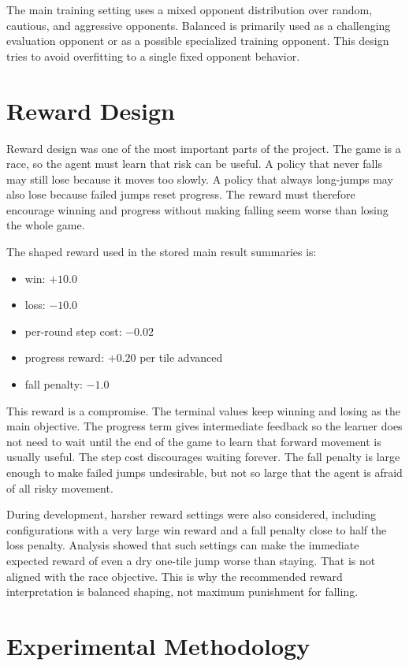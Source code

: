 \documentclass[conference]{IEEEtran}
\begin{document}
The main training setting uses a mixed opponent distribution over random,
cautious, and aggressive opponents. Balanced is primarily used as a challenging
evaluation opponent or as a possible specialized training opponent. This design
tries to avoid overfitting to a single fixed opponent behavior.

\section{Reward Design}

Reward design was one of the most important parts of the project. The game is a
race, so the agent must learn that risk can be useful. A policy that never falls
may still lose because it moves too slowly. A policy that always long-jumps may
also lose because failed jumps reset progress. The reward must therefore encourage
winning and progress without making falling seem worse than losing the whole game.

The shaped reward used in the stored main result summaries is:

\begin{itemize}
\item win: $+10.0$
\item loss: $-10.0$
\item per-round step cost: $-0.02$
\item progress reward: $+0.20$ per tile advanced
\item fall penalty: $-1.0$
\end{itemize}

This reward is a compromise. The terminal values keep winning and losing as the
main objective. The progress term gives intermediate feedback so the learner does
not need to wait until the end of the game to learn that forward movement is
usually useful. The step cost discourages waiting forever. The fall penalty is
large enough to make failed jumps undesirable, but not so large that the agent is
afraid of all risky movement.

During development, harsher reward settings were also considered, including
configurations with a very large win reward and a fall penalty close to half the
loss penalty. Analysis showed that such settings can make the immediate expected
reward of even a dry one-tile jump worse than staying. That is not aligned with the
race objective. This is why the recommended reward interpretation is balanced
shaping, not maximum punishment for falling.

\section{Experimental Methodology}
\end{document}
